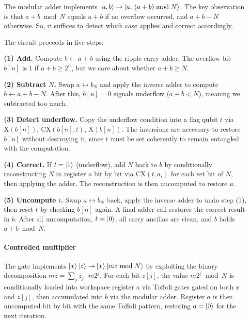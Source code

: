 \documentclass[11pt,a4paper]{article}
\begin{document}
The modular adder implements $\ket{a,b} \to \ket{a,\,(a+b) \bmod N}$. The key observation is that $a + b \bmod N$ equals
$a + b$ if no overflow occurred, and $a + b - N$ otherwise. So, it suffices to detect
which case applies and correct accordingly.

The circuit proceeds in five steps:

\textbf{(1) Add.} Compute $b \leftarrow a + b$ using the ripple-carry adder. The overflow
bit $b[n]$ is $1$ if $a + b \geq 2^n$, but we care about whether $a + b \geq N$.

\textbf{(2) Subtract $N$.} Swap $a \leftrightarrow b_N$ and apply the inverse adder
to compute $b \leftarrow a + b - N$. After this, $b[n] = 0$ signals underflow
($a + b < N$), meaning we subtracted too much.

\textbf{(3) Detect underflow.} Copy the underflow condition into a flag qubit $t$
via $\mathrm{X}(b[n])$, $\mathrm{CX}(b[n], t)$, $\mathrm{X}(b[n])$.
The inversions are necessary to restore $b[n]$ without destroying it,
since $t$ must be set coherently to remain entangled with the computation.

\textbf{(4) Correct.} If $t = \ket{1}$ (underflow), add $N$ back to $b$ by
conditionally reconstructing $N$ in register $a$ bit by bit via
$\mathrm{CX}(t, a_i)$ for each set bit of $N$, then applying the adder.
The reconstruction is then uncomputed to restore $a$.

\textbf{(5) Uncompute $t$.} Swap $a \leftrightarrow b_N$ back, apply the inverse
adder to undo step (1), then reset $t$ by checking $b[n]$ again.
A final adder call restores the correct result in $b$.
After all uncomputation, $t = \ket{0}$, all carry ancillas are clean,
and $b$ holds $a + b \bmod N$.

\paragraph{Controlled multiplier}
The gate implements $\ket{x}\ket{z} \to \ket{x}\ket{mz \bmod N}$ by exploiting the
binary decomposition $mz = \sum_j z_j \cdot m 2^j$. For each bit $z[j]$, the value
$m 2^j \bmod N$ is conditionally loaded into workspace register $a$ via Toffoli gates
gated on both $x$ and $z[j]$, then accumulated into $b$ via the modular adder.
Register $a$ is then uncomputed bit by bit with the same Toffoli pattern, restoring
$a = \ket{0}$ for the next iteration.
\end{document}
